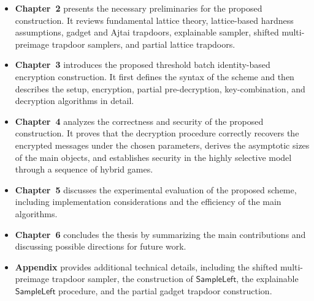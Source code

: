 \begin{itemize}
    \item \textbf{Chapter~2} presents the necessary preliminaries for the proposed construction. 
    It reviews fundamental lattice theory, lattice-based hardness assumptions, gadget and 
    Ajtai trapdoors, explainable sampler, shifted multi-preimage trapdoor 
    samplers, and partial lattice trapdoors.

    \item \textbf{Chapter~3} introduces the proposed threshold batch identity-based encryption 
    construction. It first defines the syntax of the scheme and then describes the setup, 
    encryption, partial pre-decryption, key-combination, and decryption algorithms in detail.

    \item \textbf{Chapter~4} analyzes the correctness and security of the proposed construction. 
    It proves that the decryption procedure correctly recovers the encrypted messages under 
    the chosen parameters, derives the asymptotic sizes of the main objects, and establishes 
    security in the highly selective model through a sequence of hybrid games.

    \item \textbf{Chapter~5} discusses the experimental evaluation of the proposed scheme, 
    including implementation considerations and the efficiency of the main algorithms.

    \item \textbf{Chapter~6} concludes the thesis by summarizing the main contributions and 
    discussing possible directions for future work.

    \item \textbf{Appendix} provides additional technical details, including the shifted 
    multi-preimage trapdoor sampler, the construction of $\mathsf{SampleLeft}$, the explainable 
    $\mathsf{SampleLeft}$ procedure, and the partial gadget trapdoor construction.
\end{itemize}


% 
